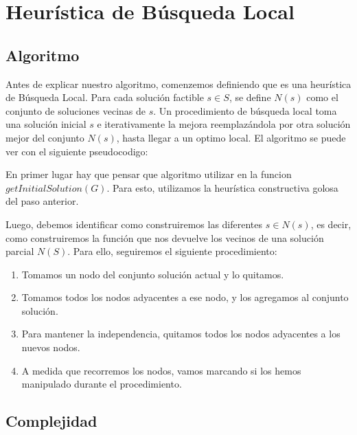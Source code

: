 \section{Heurística de Búsqueda Local}

\subsection{Algoritmo}

Antes de explicar nuestro algoritmo, comenzemos definiendo que es una heurística de Búsqueda Local. Para cada solución factible $s \in S$, se define $N(s)$ como el conjunto de soluciones vecinas de $s$. Un procedimiento de búsqueda local toma una solución inicial $s$ e iterativamente la mejora reemplazándola por otra solución mejor del conjunto $N(s)$, hasta llegar a un optimo local. El algoritmo se puede ver con el siguiente pseudocodigo:

\begin{algorithmic}
		\EndIf
	\EndFor
\EndWhile
\EndProcedure
\end{algorithmic}

\hspace{1px}

En primer lugar hay que pensar que algoritmo utilizar en la funcion $getInitialSolution(G)$. Para esto, utilizamos la heurística constructiva golosa del paso anterior.

Luego, debemos identificar como construiremos las diferentes $s \in N(s)$, es decir, como construiremos la función que nos devuelve los vecinos de una solución parcial $N(S)$. Para ello, seguiremos el siguiente procedimiento:

\begin{enumerate}
\item Tomamos un nodo del conjunto solución actual y lo quitamos.
\item Tomamos todos los nodos adyacentes a ese nodo, y los agregamos al conjunto solución.
\item Para mantener la independencia, quitamos todos los nodos adyacentes a los nuevos nodos.
\item A medida que recorremos los nodos, vamos marcando si los hemos manipulado durante el procedimiento.
\end{enumerate}

\subsection{Complejidad}